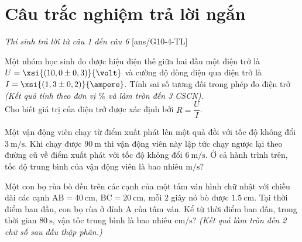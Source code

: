 \section{Câu trắc nghiệm trả lời ngắn} \textit{Thí sinh trả lời từ câu 1 đến câu 6}
\setcounter{ex}{0}
[ans/G10-4-TL]
\begin{ex}
	Một nhóm học sinh đo được hiệu điện thế giữa hai đầu một điện trở là $U=\xsi{\left(10,0\pm0,3\right)}{\volt}$ và cường độ dòng điện qua điện trở là $I=\xsi{\left(1,3\pm0,2\right)}{\ampere}$. Tính sai số tương đối trong phép đo điện trở \textit{(Kết quả tính theo đơn vị $\si{\percent}$ và làm tròn đến 3 CSCN)}.\\
	Cho biết giá trị của điện trở được xác định bởi $R=\dfrac{U}{I}$.
\end{ex}
\begin{ex}
	Một vận động viên chạy từ điểm xuất phát lên một quả đồi với tốc độ không đổi $\SI{3}{\meter/\second}$. Khi chạy được $\SI{90}{\meter}$ thì vận động viên này lập tức chạy ngược lại theo đường cũ về điểm xuất phát với tốc độ không đổi $\SI{6}{\meter/\second}$. Ở cả hành trình trên, tốc độ trung bình của vận động viên là bao nhiêu $\si{\meter/\second}$?
\end{ex}
\begin{ex}
	Một con bọ rùa bò đều trên các cạnh của một tấm ván hình chữ nhật với chiều dài các cạnh $\mathrm{AB}=\SI{40}{\centi\meter}$, $\mathrm{BC}=\SI{20}{\centi\meter}$, mỗi 2 giây nó bò được $\SI{1.5}{\centi\meter}$. Tại thời điểm ban đầu, con bọ rùa ở đỉnh A của tấm ván. Kể từ thời điểm ban đầu, trong thời gian $\SI{80}{\second}$, vận tốc trung bình là bao nhiêu $\si{\centi\meter/\second}$? \textit{(Kết quả làm tròn đến 2 chữ số sau dấu thập phân.)}
\end{ex}
